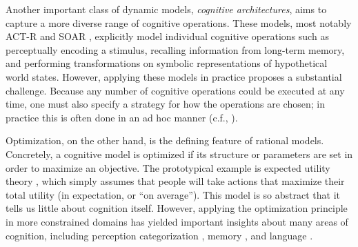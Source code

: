 
Another important class of dynamic models, \emph{cognitive architectures}, aims to capture a more diverse range of cognitive operations. These models, most notably ACT-R \citep{anderson1996act} and SOAR \citep{laird1987soar}, explicitly model individual cognitive operations such as perceptually encoding a stimulus, recalling information from long-term memory, and performing transformations on symbolic representations of hypothetical world states. 
However, applying these models in practice proposes a substantial challenge. Because any number of cognitive operations could be executed at any time, one must also specify a strategy for how the operations are chosen; in practice this is often done in an ad hoc manner (c.f., \citealp{howes2009rational}).

Optimization, on the other hand, is the defining feature of rational models. Concretely, a cognitive model is optimized if its structure or parameters are set in order to maximize an objective. The prototypical example is expected utility theory \citep{vonneumann1944theory,savage1954foundations}, which simply assumes that people will take actions that maximize their total utility (in expectation, or ``on average''). This model is so abstract that it tells us little about cognition itself. However, applying the optimization principle in more constrained domains has yielded important insights about many areas of cognition, including perception \citep{marr1982vision,knill1996perception,najemnik2005optimal} categorization \citep{anderson1991adaptive,ashby1995categorization}, memory \citep{anderson1989human}, and language \citep{goldwater2009bayesian}.




